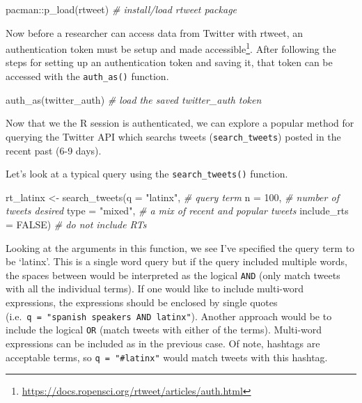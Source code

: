 \documentclass[
  letterpaper,
]{scrbook}
\newenvironment{Shaded}{\begin{snugshade}}{\end{snugshade}}
\newcommand{\AttributeTok}[1]{\textcolor[rgb]{0.00,0.00,0.00}{#1}}
\newcommand{\CommentTok}[1]{\textcolor[rgb]{0.00,0.00,0.00}{\textit{#1}}}
\newcommand{\ConstantTok}[1]{\textcolor[rgb]{0.00,0.00,0.00}{#1}}
\newcommand{\DecValTok}[1]{\textcolor[rgb]{0.00,0.00,0.00}{#1}}
\newcommand{\FunctionTok}[1]{\textcolor[rgb]{0.00,0.00,0.00}{#1}}
\newcommand{\NormalTok}[1]{\textcolor[rgb]{0.00,0.00,0.00}{#1}}
\newcommand{\OtherTok}[1]{\textcolor[rgb]{0.00,0.00,0.00}{#1}}
\newcommand{\SpecialCharTok}[1]{\textcolor[rgb]{0.00,0.00,0.00}{#1}}
\newcommand{\StringTok}[1]{\textcolor[rgb]{0.00,0.00,0.00}{#1}}
\DeclareRobustCommand{\href}[2]{#2\footnote{\url{#1}}}
\begin{document}
\begin{Shaded}
\begin{Highlighting}[]
\NormalTok{pacman}\SpecialCharTok{::}\FunctionTok{p\_load}\NormalTok{(rtweet) }\CommentTok{\# install/load rtweet package}
\end{Highlighting}
\end{Shaded}

Now before a researcher can access data from Twitter with rtweet,
\href{https://docs.ropensci.org/rtweet/articles/auth.html}{an
authentication token must be setup and made accessible}. After following
the steps for setting up an authentication token and saving it, that
token can be accessed with the \texttt{auth\_as()} function.

\begin{Shaded}
\begin{Highlighting}[]
\FunctionTok{auth\_as}\NormalTok{(twitter\_auth) }\CommentTok{\# load the saved \textasciigrave{}twitter\_auth\textasciigrave{} token}
\end{Highlighting}
\end{Shaded}

Now that we the R session is authenticated, we can explore a popular
method for querying the Twitter API which searchs tweets
(\texttt{search\_tweets}) posted in the recent past (6-9 days).

Let's look at a typical query using the \texttt{search\_tweets()}
function.

\begin{Shaded}
\begin{Highlighting}[]
\NormalTok{rt\_latinx }\OtherTok{\textless{}{-}} 
  \FunctionTok{search\_tweets}\NormalTok{(}\AttributeTok{q =} \StringTok{"latinx"}\NormalTok{, }\CommentTok{\# query term}
                \AttributeTok{n =} \DecValTok{100}\NormalTok{, }\CommentTok{\# number of tweets desired}
                \AttributeTok{type =} \StringTok{"mixed"}\NormalTok{, }\CommentTok{\# a mix of \textasciigrave{}recent\textasciigrave{} and \textasciigrave{}popular\textasciigrave{} tweets}
                \AttributeTok{include\_rts =} \ConstantTok{FALSE}\NormalTok{) }\CommentTok{\# do not include RTs}
\end{Highlighting}
\end{Shaded}

Looking at the arguments in this function, we see I've specified the
query term to be `latinx'. This is a single word query but if the query
included multiple words, the spaces between would be interpreted as the
logical \texttt{AND} (only match tweets with all the individual terms).
If one would like to include multi-word expressions, the expressions
should be enclosed by single quotes
(i.e.~\texttt{q\ =\ "\textquotesingle{}spanish\ speakers\textquotesingle{}\ AND\ latinx"}).
Another approach would be to include the logical \texttt{OR} (match
tweets with either of the terms). Multi-word expressions can be included
as in the previous case. Of note, hashtags are acceptable terms, so
\texttt{q\ =\ "\#latinx"} would match tweets with this hashtag.
\end{document}
